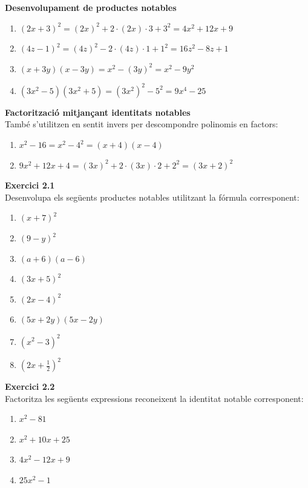 \documentclass[12pt]{article}
\begin{document}
\begin{exemple}
\textbf{Desenvolupament de productes notables}
\begin{enumerate}[label=\alph*)]
    \item $(2x + 3)^2 = (2x)^2 + 2 \cdot (2x) \cdot 3 + 3^2 = 4x^2 + 12x + 9$
    \item $(4z - 1)^2 = (4z)^2 - 2 \cdot (4z) \cdot 1 + 1^2 = 16z^2 - 8z + 1$
    \item $(x + 3y)(x - 3y) = x^2 - (3y)^2 = x^2 - 9y^2$
    \item $(3x^2 - 5)(3x^2 + 5) = (3x^2)^2 - 5^2 = 9x^4 - 25$
\end{enumerate}
\end{exemple}

\begin{exemple}
\textbf{Factorització mitjançant identitats notables}\\
També s'utilitzen en sentit invers per descompondre polinomis en factors:
\begin{enumerate}[label=\alph*)]
    \item $x^2 - 16 = x^2 - 4^2 = (x + 4)(x - 4)$
    \item $9x^2 + 12x + 4 = (3x)^2 + 2 \cdot (3x) \cdot 2 + 2^2 = (3x + 2)^2$
\end{enumerate}
\end{exemple}

\begin{exercici}
\textbf{Exercici 2.1}\\
Desenvolupa els següents productes notables utilitzant la fórmula corresponent:
\begin{enumerate}[label=\alph*)]
    \item $(x + 7)^2$
    \item $(9 - y)^2$
    \item $(a + 6)(a - 6)$
    \item $(3x + 5)^2$
    \item $(2x - 4)^2$
    \item $(5x + 2y)(5x - 2y)$
    \item $(x^2 - 3)^2$
    \item $\left(2x + \frac{1}{2}\right)^2$
\end{enumerate}
\end{exercici}

\begin{exercici}
\textbf{Exercici 2.2}\\
Factoritza les següents expressions reconeixent la identitat notable corresponent:
\begin{enumerate}[label=\alph*)]
    \item $x^2 - 81$
    \item $x^2 + 10x + 25$
    \item $4x^2 - 12x + 9$
    \item $25x^2 - 1$
\end{enumerate}
\end{exercici}
\end{document}
